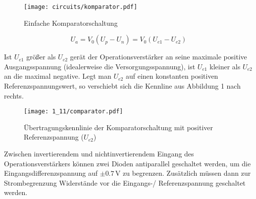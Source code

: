 \begin{figure}[H]
  \begin{center}
    \texttt{[image: circuits/komparator.pdf]}
  \end{center}
  \caption{Einfache Komparatorschaltung}
\end{figure}

\[ U_a = V_0 (U_p - U_n) = V_0 (U_{e1} - U_{e2})\]

Ist $U_{e1}$ größer als $U_{e2}$ gerät der Operationsverstärker an seine
maximale positive Ausgangsspannung (idealerweise die
Versorgungsspannung), ist $U_{e1}$ kleiner als $U_{e2}$ an die maximal negative.
Legt man $U_{e2}$ auf einen konstanten positiven Referenzspannungswert, so verschiebt sich
die Kennline aus Abbildung 1 nach rechts.

\begin{figure}[H]
  \begin{center}
    \texttt{[image: 1\_11/comparator.pdf]}
  \end{center}
  \caption{Übertragungskennlinie der Komparatorschaltung mit positiver Referenzspannung ($U_{e2}$)}
\end{figure}


Zwischen invertierendem und nichtinvertierendem Eingang des
Operationsverstärkers können zwei Dioden antiparallel geschaltet werden, um die
Eingangsdifferenzspannung auf $\pm 0.7 \, \si{\volt}$ zu begrenzen. Zusätzlich
müssen dann zur Strombegrenzung Widerstände vor die Eingangs-/ Referenzspannung
geschaltet werden. 